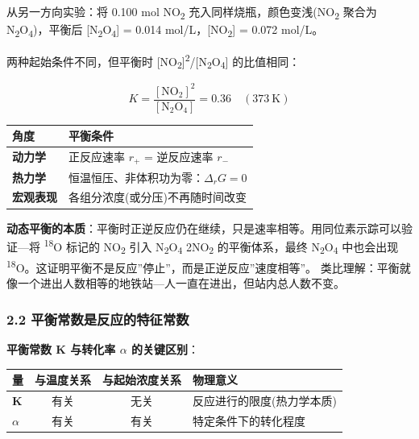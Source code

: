从另一方向实验：将 0.100 mol NO\textsubscript{2} 充入同样烧瓶，颜色变浅(NO\textsubscript{2} 聚合为 N\textsubscript{2}O\textsubscript{4})，平衡后 {[}N\textsubscript{2}O\textsubscript{4}{]} = 0.014 mol/L，{[}NO\textsubscript{2}{]} = 0.072 mol/L。

两种起始条件不同，但平衡时 {[}NO\textsubscript{2}{]}\textsuperscript{2}/{[}N\textsubscript{2}O\textsubscript{4}{]} 的比值相同：

\[
K = \frac{[\mathrm{NO_2}]^2}{[\mathrm{N_2O_4}]} = 0.36 \quad (373\ \mathrm{K})
\]

{\def\LTcaptype{none} %
\begin{longtable}[]{@{}ll@{}}
\toprule\noalign{}
角度 & 平衡条件 \\
\midrule\noalign{}
\endhead
\bottomrule\noalign{}
\endlastfoot
\textbf{动力学} & 正反应速率 \(r_+\) = 逆反应速率 \(r_-\) \\
\textbf{热力学} & 恒温恒压、非体积功为零：\(\Delta_r G = 0\) \\
\textbf{宏观表现} & 各组分浓度(或分压)不再随时间改变 \\
\end{longtable}
}

\textbf{动态平衡的本质}：平衡时正逆反应仍在继续，只是速率相等。用同位素示踪可以验证---将 \textsuperscript{18}O 标记的 NO\textsubscript{2} 引入 N\textsubscript{2}O\textsubscript{4} \衡 2NO\textsubscript{2} 的平衡体系，最终 N\textsubscript{2}O\textsubscript{4} 中也会出现 \textsuperscript{18}O。这证明平衡不是反应''停止''，而是正逆反应''速度相等''。
类比理解：平衡就像一个进出人数相等的地铁站---人一直在进出，但站内总人数不变。

\subsubsection{2.2 平衡常数是反应的特征常数}\label{ux5e73ux8861ux5e38ux6570ux662fux53cdux5e94ux7684ux7279ux5f81ux5e38ux6570}

\textbf{平衡常数 K 与转化率 \(\alpha\) 的关键区别}：

{\def\LTcaptype{none} %
\begin{longtable}[]{@{}lccl@{}}
\toprule\noalign{}
量 & 与温度关系 & 与起始浓度关系 & 物理意义 \\
\midrule\noalign{}
\endhead
\bottomrule\noalign{}
\endlastfoot
\textbf{K} & 有关 & 无关 & 反应进行的限度(热力学本质) \\
\textbf{\(\alpha\)} & 有关 & 有关 & 特定条件下的转化程度 \\
\end{longtable}
}

